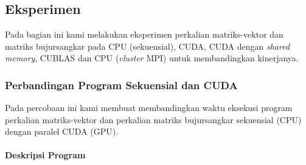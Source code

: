 \chapter{\topikDua}

\section{Eksperimen}
Pada bagian ini kami melakukan eksperimen perkalian matriks-vektor dan matriks bujursangkar pada CPU (sekuensial), CUDA, CUDA dengan \textit{shared memory}, CUBLAS dan CPU (\textit{cluster} MPI) untuk membandingkan kinerjanya.

\subsection{Perbandingan Program Sekuensial dan CUDA} 

Pada percobaan ini kami membuat membandingkan waktu eksekusi program perkalian matriks-vektor dan perkalian matriks bujursangkar sekuensial (CPU) dengan paralel CUDA (GPU). 

\subsubsection{Deskripsi Program}


